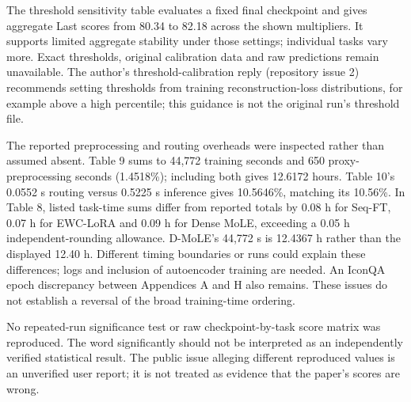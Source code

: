 \documentclass[10pt]{article}
\begin{document}
The threshold sensitivity table evaluates a fixed final checkpoint and gives aggregate Last scores from 80.34 to 82.18 across the shown multipliers. It supports limited aggregate stability under those settings; individual tasks vary more. Exact thresholds, original calibration data and raw predictions remain unavailable. The author’s threshold-calibration reply (repository issue 2) recommends setting thresholds from training reconstruction-loss distributions, for example above a high percentile; this guidance is not the original run’s threshold file.\par
The reported preprocessing and routing overheads were inspected rather than assumed absent. Table 9 sums to 44,772 training seconds and 650 proxy-preprocessing seconds (1.4518\%); including both gives 12.6172 hours. Table 10’s 0.0552 s routing versus 0.5225 s inference gives 10.5646\%, matching its 10.56\%. In Table 8, listed task-time sums differ from reported totals by 0.08 h for Seq-FT, 0.07 h for EWC-LoRA and 0.09 h for Dense MoLE, exceeding a 0.05 h independent-rounding allowance. D-MoLE’s 44,772 s is 12.4367 h rather than the displayed 12.40 h. Different timing boundaries or runs could explain these differences; logs and inclusion of autoencoder training are needed. An IconQA epoch discrepancy between Appendices A and H also remains. These issues do not establish a reversal of the broad training-time ordering.\par
No repeated-run significance test or raw checkpoint-by-task score matrix was reproduced. The word significantly should not be interpreted as an independently verified statistical result. The public issue alleging different reproduced values is an unverified user report; it is not treated as evidence that the paper’s scores are wrong.\par
\end{document}
